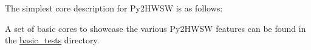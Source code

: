 %

The simplest core description for Py2HWSW is as follows:


A set of basic cores to showcase the various Py2HWSW features can be found in
the \href{https://github.com/IObundle/py2hwsw/tree/main/py2hwsw/lib/hardware/basic_tests}{basic\_tests}
directory.
